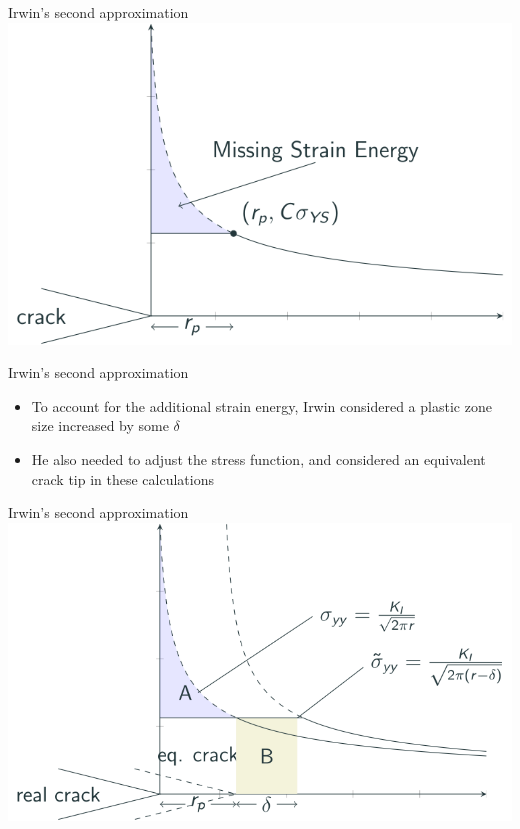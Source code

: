 \documentclass[
  letterpaper,
  ignorenonframetext,
  aspectratio=43,
  handout,
  12pt]{beamer}
\providecommand{\tightlist}{%
  \setlength{\itemsep}{0pt}\setlength{\parskip}{0pt}}
\providecommand{\tightlist}{%
\setlength{\itemsep}{0pt}\setlength{\parskip}{0pt}}
\let\Oldincludegraphics\includegraphics
\renewcommand{\includegraphics}[2][]{\Oldincludegraphics[width=\textwidth,height=0.7\textheight,keepaspectratio]{#2}}
\begin{document}
\begin{frame}{Irwin's second approximation}
\protect\hypertarget{irwins-second-approximation-1}{}
\includegraphics{../images/plastic-missing.svg}
\end{frame}

\begin{frame}{Irwin's second approximation}
\protect\hypertarget{irwins-second-approximation-2}{}
\begin{itemize}
\tightlist
\item
  To account for the additional strain energy, Irwin considered a
  plastic zone size increased by some \(\delta\)
\item
  He also needed to adjust the stress function, and considered an
  equivalent crack tip in these calculations
\end{itemize}
\end{frame}

\begin{frame}{Irwin's second approximation}
\protect\hypertarget{irwins-second-approximation-3}{}
\includegraphics{../images/plastic-equivalent.svg}
\end{frame}
\end{document}
